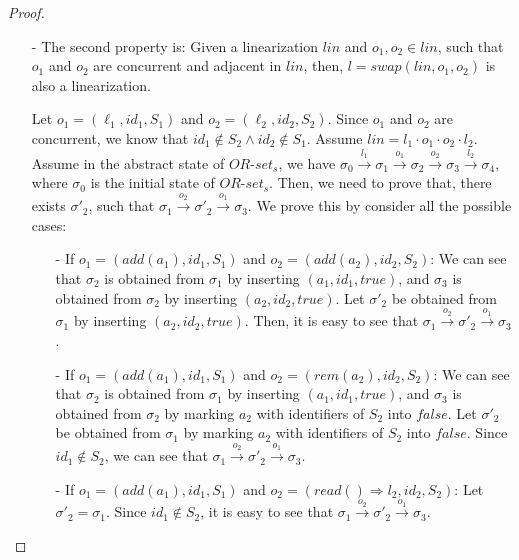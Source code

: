 {\begin {proof}
\begin{itemize}
\item[-] The second property is: Given a linearization $\mathit{lin}$ and $o_1,o_2 \in \mathit{lin}$, such that $o_1$ and $o_2$ are concurrent and adjacent in $\mathit{lin}$, then, $l = \mathit{swap}(\mathit{lin},o_1,o_2)$ is also a linearization.

    Let $o_1 = (\ell_1,\mathit{id}_1,S_1)$ and $o_2 = (\ell_2,\mathit{id}_2,S_2)$. Since $o_1$ and $o_2$ are concurrent, we know that $\mathit{id}_1 \notin S_2 \wedge \mathit{id}_2 \notin S_1$. Assume $\mathit{lin} = l_1 \cdot o_1 \cdot o_2 \cdot l_2$. Assume in the abstract state of $\mathit{OR}$-$\mathit{set}_s$, we have $\sigma_0 {\xrightarrow{l_1}} \sigma_1 {\xrightarrow{o_1}} \sigma_2 {\xrightarrow{o_2}} \sigma_3 {\xrightarrow{l_2}} \sigma_4$, where $\sigma_0$ is the initial state of $\mathit{OR}$-$\mathit{set}_s$. Then, we need to prove that, there exists $\sigma'_2$, such that $\sigma_1 {\xrightarrow{o_2}} \sigma'_2 {\xrightarrow{o_1}} \sigma_3$. We prove this by consider all the possible cases:

    \begin{itemize}
    \setlength{\itemsep}{0.5pt}
    \item[-] If $o_1 = (\mathit{add}(a_1),\mathit{id}_1,S_1)$ and $o_2 = (\mathit{add}(a_2),\mathit{id}_2,S_2)$: We can see that $\sigma_2$ is obtained from $\sigma_1$ by inserting $(a_1,\mathit{id}_1,\mathit{true})$, and $\sigma_3$ is obtained from $\sigma_2$ by inserting $(a_2,\mathit{id}_2,\mathit{true})$. Let $\sigma'_2$ be obtained from $\sigma_1$ by inserting $(a_2,\mathit{id}_2,\mathit{true})$. Then, it is easy to see that $\sigma_1 {\xrightarrow{o_2}} \sigma'_2 {\xrightarrow{o_1}} \sigma_3$.

    \item[-] If $o_1 = (\mathit{add}(a_1),\mathit{id}_1,S_1)$ and $o_2 = (\mathit{rem}(a_2),\mathit{id}_2,S_2)$: We can see that $\sigma_2$ is obtained from $\sigma_1$ by inserting $(a_1,\mathit{id}_1,\mathit{true})$, and $\sigma_3$ is obtained from $\sigma_2$ by marking $a_2$ with identifiers of $S_2$ into $\mathit{false}$. Let $\sigma'_2$ be obtained from $\sigma_1$ by marking $a_2$ with identifiers of $S_2$ into $\mathit{false}$. Since $\mathit{id_1} \notin S_2$, we can see that $\sigma_1 {\xrightarrow{o_2}} \sigma'_2 {\xrightarrow{o_1}} \sigma_3$.

    \item[-] If $o_1 = (\mathit{add}(a_1),\mathit{id}_1,S_1)$ and $o_2 = (\mathit{read}() \Rightarrow l_2,\mathit{id}_2,S_2)$: Let $\sigma'_2 = \sigma_1$. Since $\mathit{id}_1 \notin S_2$, it is easy to see that $\sigma_1 {\xrightarrow{o_2}} \sigma'_2 {\xrightarrow{o_1}} \sigma_3$.


\end{itemize}
\end{itemize}
\end{proof}}
